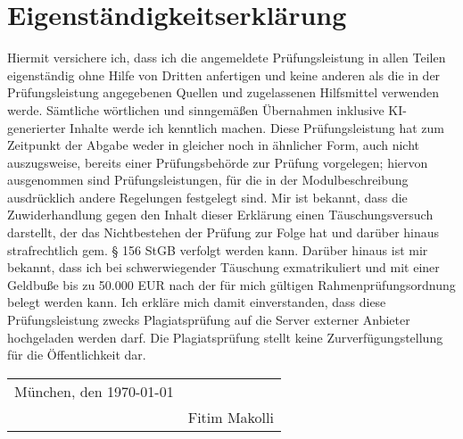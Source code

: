\chapter*{Eigenständigkeitserklärung}
Hiermit versichere ich, dass ich die angemeldete Prüfungsleistung in allen Teilen eigenständig ohne Hilfe von Dritten anfertigen und keine anderen als die in der Prüfungsleistung angegebenen Quellen und zugelassenen Hilfsmittel verwenden werde.
Sämtliche wörtlichen und sinngemäßen Übernahmen inklusive KI-generierter Inhalte werde ich kenntlich machen.
Diese Prüfungsleistung hat zum Zeitpunkt der Abgabe weder in gleicher noch in ähnlicher Form, auch nicht auszugsweise, bereits einer Prüfungsbehörde zur Prüfung vorgelegen; hiervon ausgenommen sind Prüfungsleistungen, für die in der Modulbeschreibung ausdrücklich andere Regelungen festgelegt sind.
Mir ist bekannt, dass die Zuwiderhandlung gegen den Inhalt dieser Erklärung einen Täuschungsversuch darstellt, der das Nichtbestehen der Prüfung zur Folge hat und darüber hinaus strafrechtlich gem. § 156 StGB verfolgt werden kann.
Darüber hinaus ist mir bekannt, dass ich bei schwerwiegender Täuschung exmatrikuliert und mit einer Geldbuße bis zu 50.000 EUR nach der für mich gültigen Rahmenprüfungsordnung belegt werden kann.
Ich erkläre mich damit einverstanden, dass diese Prüfungsleistung zwecks Plagiatsprüfung auf die Server externer Anbieter hochgeladen werden darf. Die Plagiatsprüfung stellt keine Zurverfügungstellung für die Öffentlichkeit dar.

\vspace{6cm}
\begin{tabular}{@{}p{6cm}p{6cm}@{}}
	München, den \today & \hrulefill \\
	& Fitim Makolli \\
	\end{tabular}